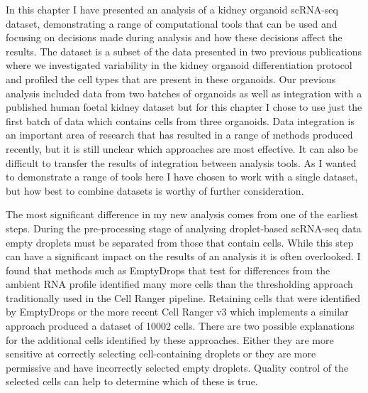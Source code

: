 \documentclass[11pt,a4paper,titlepage,twoside,openright]{style/unimelbthesis}
\theoremstyle{definition}
\theoremstyle{definition}
\theoremstyle{definition}
\theoremstyle{remark}
\begin{document}
\begin{mainmatter}
In this chapter I have presented an analysis of a kidney organoid scRNA-seq dataset, demonstrating a range of computational tools that can be used and focusing on decisions made during analysis and how these decisions affect the results. The dataset is a subset of the data presented in two previous publications where we investigated variability in the kidney organoid differentiation protocol and profiled the cell types that are present in these organoids. Our previous analysis included data from two batches of organoids as well as integration with a published human foetal kidney dataset but for this chapter I chose to use just the first batch of data which contains cells from three organoids. Data integration is an important area of research that has resulted in a range of methods produced recently, but it is still unclear which approaches are most effective. It can also be difficult to transfer the results of integration between analysis tools. As I wanted to demonstrate a range of tools here I have chosen to work with a single dataset, but how best to combine datasets is worthy of further consideration.

The most significant difference in my new analysis comes from one of the earliest steps. During the pre-processing stage of analysing droplet-based scRNA-seq data empty droplets must be separated from those that contain cells. While this step can have a significant impact on the results of an analysis it is often overlooked. I found that methods such as EmptyDrops that test for differences from the ambient RNA profile identified many more cells than the thresholding approach traditionally used in the Cell Ranger pipeline. Retaining cells that were identified by EmptyDrops or the more recent Cell Ranger v3 which implements a similar approach produced a dataset of 10002 cells. There are two possible explanations for the additional cells identified by these approaches. Either they are more sensitive at correctly selecting cell-containing droplets or they are more permissive and have incorrectly selected empty droplets. Quality control of the selected cells can help to determine which of these is true.


\end{mainmatter}
\end{document}
